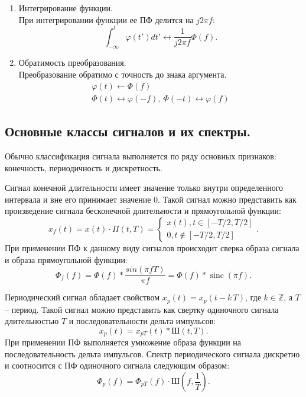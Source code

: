 \documentclass[a4paper,14pt]{extarticle}
\DeclareMathOperator{\sinc}{sinc}
\begin{document}
\begin{enumerate}
\item Интегрирование функции. \\ При интегрировании функции ее ПФ делится на $j 2 \pi f$:
\begin{equation*}
\int_{-\infty}^{t} \varphi(t') dt' \leftrightarrow \frac{1}{j 2 \pi f} \Phi (f).
\end{equation*}

\item Обратимость преобразования. \\ Преобразование обратимо с точность до знака аргумента. 
\begin{gather*}
\varphi(t) \leftarrow \Phi (f) \\ \Phi(t) \leftrightarrow \varphi (-f), ~ \Phi(-t) \leftrightarrow \varphi(f)
\end{gather*}

\end{enumerate}  


\subsection{Основные классы сигналов и их спектры.}

Обычно классификация сигнала выполняется по ряду основных признаков: конечность, периодичность и дискретность.

Сигнал конечной длительности имеет значение только внутри определенного интервала и вне его принимает значение 0. Такой сигнал можно представить как произведение сигнала бесконечной длительности и прямоугольной функции:
\begin{equation*}
x_f (t) = x(t) \cdot \Pi(t, T) = \begin{cases} x(t), t \in [-T/2, T/2] \\ 0, t \notin  [-T/2, T/2] \end{cases}.
\end{equation*}
При применении ПФ к данному виду сигналов происходит сверка образа сигнала и образа прямоугольной функции:
\begin{equation*}
\Phi_f(f) = \Phi(f) * \frac{sin(\pi f T)}{\pi f} = \Phi(f) * \sinc(\pi f).
\end{equation*}

Периодический сигнал обладает свойством $x_p(t) = x_p(t - k\,T)$, где $ k \in \mathbb{Z}$, а $T$ -- период. Такой сигнал можно представить как свертку одиночного сигнала длительностью $T$ и последовательности дельта импульсов:
\begin{equation*}
x_p(t) = x_{pT}(t) * \text{Ш}(t, T).
\end{equation*}
При применении ПФ выполняется умножение образа функции на последовательность дельта импульсов. Спектр периодического сигнала дискретно и соотносится с ПФ одиночного сигнала следующим образом:
\begin{equation*}
\Phi_p(f) = \Phi_{pT}(f) \cdot \text{Ш}(f, \frac{1}{T}).
\end{equation*}
\end{document}
